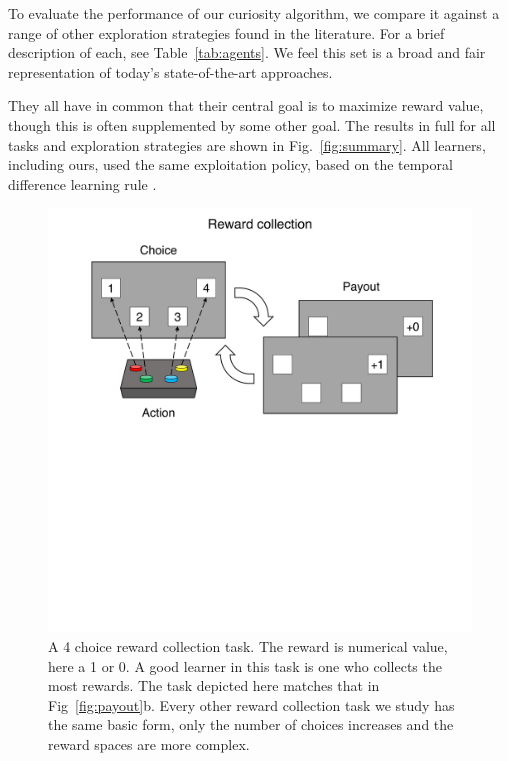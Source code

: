 To evaluate the performance of our curiosity algorithm, we compare it against a range of other exploration strategies found in the literature. For a brief description of each, see Table~\ref{tab:agents}. We feel this set is a broad and fair representation of today's state-of-the-art approaches.

They all have in common that their central goal is to maximize reward value, though this is often supplemented by some other goal.  The results in full for all tasks and exploration strategies are shown in Fig.~\ref{fig:summary}. All learners, including ours, used the same exploitation policy, based on the temporal difference learning rule \citep{Sutton2018}.

\begin{figure}
	\begin{fullwidth}
	\includegraphics[width=.55\linewidth]{img/task_outline2.pdf} 
	\caption{A 4 choice reward collection task. The reward is numerical value, here a 1 or 0. A good learner in this task is one who collects the most rewards. The task depicted here matches that in Fig~\ref{fig:payout}b. Every other reward collection task we study has the same basic form, only the number of choices increases and the reward spaces are more complex.}
	\label{fig:task_outline2} 
	\end{fullwidth}
\end{figure}

